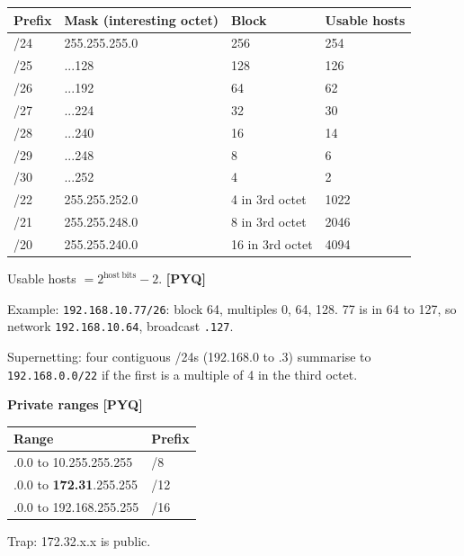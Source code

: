 \documentclass[11pt,a4paper]{article}
\newcommand{\pyq}{\textcolor{ember}{\scriptsize\textbf{[PYQ]}}}
\begin{document}
\begin{center}\small\renewcommand{\arraystretch}{1.18}\setlength{\tabcolsep}{9pt}
\begin{tabular}{@{}llll@{}}
\toprule
\textbf{\color{slate}Prefix} & \textbf{\color{slate}Mask (interesting octet)} & \textbf{\color{slate}Block} & \textbf{\color{slate}Usable hosts} \\ \midrule
/24 & 255.255.255.0 & 256 & 254 \\
/25 & ...128 & 128 & 126 \\
/26 & ...192 & 64 & 62 \\
/27 & ...224 & 32 & 30 \\
/28 & ...240 & 16 & 14 \\
/29 & ...248 & 8 & 6 \\
/30 & ...252 & 4 & 2 \\
/22 & 255.255.252.0 & 4 in 3rd octet & 1022 \\
/21 & 255.255.248.0 & 8 in 3rd octet & 2046 \\
/20 & 255.255.240.0 & 16 in 3rd octet & 4094 \\
\bottomrule
\end{tabular}\end{center}
Usable hosts $=2^{\mathrm{host\ bits}}-2$. \pyq{}

Example: \texttt{192.168.10.77/26}: block 64, multiples 0, 64, 128. 77 is in 64 to 127, so network \texttt{192.168.10.64}, broadcast \texttt{.127}.

Supernetting: four contiguous /24s (192.168.0 to .3) summarise to \texttt{192.168.0.0/22} if the first is a multiple of 4 in the third octet.

\textbf{Private ranges} \pyq{}

\begin{center}\small\renewcommand{\arraystretch}{1.18}\setlength{\tabcolsep}{9pt}
\begin{tabularx}{\linewidth}{@{}>{\raggedright\arraybackslash}Xl@{}}
\toprule
\textbf{\color{slate}Range} & \textbf{\color{slate}Prefix} \\ \midrule
10.0.0.0 to 10.255.255.255 & /8 \\
172.16.0.0 to \textbf{172.31}.255.255 & /12 \\
192.168.0.0 to 192.168.255.255 & /16 \\
\bottomrule
\end{tabularx}\end{center}
Trap: 172.32.x.x is public.
\end{document}
